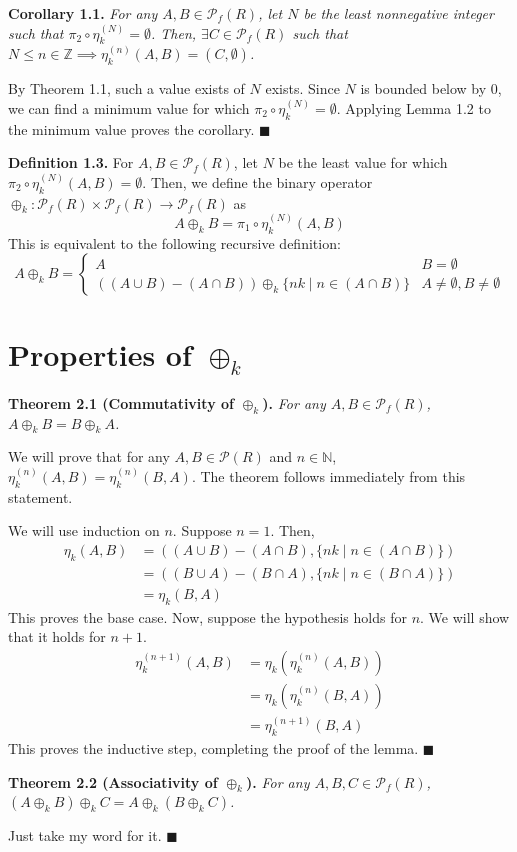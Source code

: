 \documentclass{article}
\newcommand{\zee}{\mathbb{Z}}
\newcommand{\N}{\mathbb{N}}
\begin{document}
\textbf{Corollary 1.1.} \textit{
    For any $A, B \in \mathcal{P}_f(R)$, let $N$ be the
    least nonnegative integer such that
    $\pi_2 \circ \eta_k^{(N)} = \emptyset$. Then,
    $\exists C \in \mathcal{P}_f(R)$ such that
    $N \leq n \in \zee \implies \eta_k^{(n)}(A, B) = (C, \emptyset)$.
}

By Theorem 1.1, such a value exists of $N$ exists.
Since $N$ is bounded below by 0, we can find a minimum value for which
$\pi_2 \circ \eta_k^{(N)} = \emptyset$. Applying Lemma 1.2 to the
minimum value proves the corollary. $\blacksquare$

\textbf{Definition 1.3.} For $A, B \in \mathcal{P}_f(R)$,
let $N$ be the least value for which
$\pi_2 \circ \eta_k^{(N)}(A, B) = \emptyset$. Then, we define
the binary operator $\oplus_k: \mathcal{P}_f(R) \times \mathcal{P}_f(R)
\rightarrow \mathcal{P}_f(R)$ as
\[A \oplus_k B = \pi_1 \circ \eta_k^{(N)}(A, B)\]
This is equivalent to the following recursive definition:
\[A \oplus_k B = \begin{cases}
    A & B = \emptyset \\
    ((A \cup B) - (A \cap B)) \oplus_k \{nk \mid n \in (A \cap B)\}
        & A \neq \emptyset, B \neq \emptyset
\end{cases}\]

\section{Properties of $\oplus_k$}

\textbf{Theorem 2.1 (Commutativity of $\oplus_k$).} \textit{
    For any $A, B \in \mathcal{P}_f(R)$,
    $A \oplus_k B = B \oplus_k A$.
}

We will prove that for any $A, B \in \mathcal{P}(R)$ and $n \in \N$,
$\eta_k^{(n)}(A, B) = \eta_k^{(n)}(B, A)$. The theorem
follows immediately from this statement.

We will use induction on $n$. Suppose $n = 1$. Then,
\[\begin{split}
    \eta_k(A, B)
    &= ((A \cup B) - (A \cap B), \{nk \mid n \in (A \cap B)\}) \\
    &= ((B \cup A) - (B \cap A), \{nk \mid n \in (B \cap A)\}) \\
    &= \eta_k(B, A)
\end{split}\]
This proves the base case. Now, suppose the hypothesis holds
for $n$. We will show that it holds for $n+1$.
\[\begin{split}
    \eta_k^{(n+1)}(A, B) &= \eta_k(\eta_k^{(n)}(A, B)) \\
    &= \eta_k(\eta_k^{(n)}(B, A)) \\
    &= \eta_k^{(n+1)}(B, A)
\end{split}\]
This proves the inductive step, completing the proof of the
lemma. $\blacksquare$

\textbf{Theorem 2.2 (Associativity of $\oplus_k$).} \textit{
    For any $A, B, C \in \mathcal{P}_f(R)$,
    $(A \oplus_k B) \oplus_k C = A \oplus_k (B \oplus_k C)$.
}

Just take my word for it. $\blacksquare$
\end{document}
